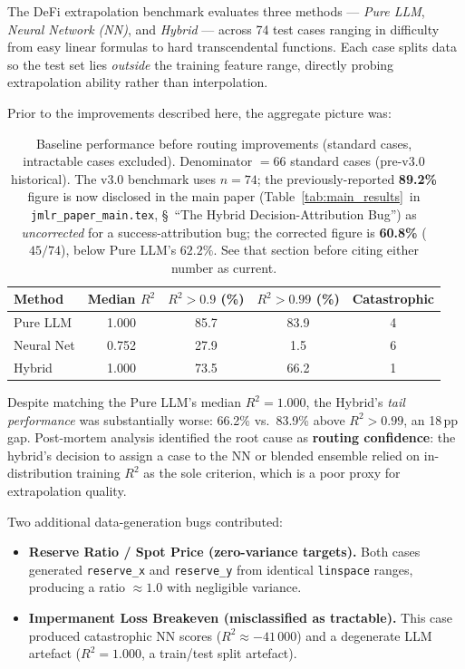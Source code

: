 \documentclass[twoside,11pt]{article}
\begin{document}
The DeFi extrapolation benchmark evaluates three methods --- \emph{Pure LLM},
\emph{Neural Network (NN)}, and \emph{Hybrid} --- across 74 test cases ranging
in difficulty from easy linear formulas to hard transcendental functions.
Each case splits data so the test set lies \emph{outside} the training feature
range, directly probing extrapolation ability rather than interpolation.

Prior to the improvements described here, the aggregate picture was:

\begin{table}[h]
\centering
\caption{Baseline performance before routing improvements (standard cases,
         intractable cases excluded). Denominator $= 66$ standard cases
         (pre-v3.0 historical). The v3.0 benchmark uses $n=74$; the
         previously-reported \textbf{89.2\%} figure is now disclosed in the
         main paper (Table~\ref{tab:main_results}\ in
         \texttt{jmlr\_paper\_main.tex}, \S~``The Hybrid
         Decision-Attribution Bug'') as \emph{uncorrected} for a
         success-attribution bug; the corrected figure is
         \textbf{60.8\%} ($45/74$), below Pure LLM's $62.2\%$. See that
         section before citing either number as current.}
\label{tab:baseline}
\begin{tabular}{lcccc}
\toprule
Method & Median $R^2$ & $R^2 > 0.9$ (\%) & $R^2 > 0.99$ (\%) & Catastrophic \\
\midrule
Pure LLM    & 1.000 & 85.7 & 83.9 & 4 \\
Neural Net  & 0.752 & 27.9 &  1.5 & 6 \\
Hybrid      & 1.000 & 73.5 & 66.2 & 1 \\
\bottomrule
\end{tabular}
\end{table}

Despite matching the Pure LLM's median $R^2 = 1.000$, the Hybrid's
\emph{tail performance} was substantially worse: 66.2\% vs.\ 83.9\% above
$R^2 > 0.99$, an 18\,pp gap.  Post-mortem analysis identified the root cause
as \textbf{routing confidence}: the hybrid's decision to assign a case to the
NN or blended ensemble relied on in-distribution training $R^2$ as the sole
criterion, which is a poor proxy for extrapolation quality.

Two additional data-generation bugs contributed:

\begin{itemize}[leftmargin=*]
  \item \textbf{Reserve Ratio / Spot Price (zero-variance targets).}
    Both cases generated \texttt{reserve\_x} and \texttt{reserve\_y} from
    identical \texttt{linspace} ranges, producing a ratio $\approx 1.0$ with
    negligible variance.
  \item \textbf{Impermanent Loss Breakeven (misclassified as tractable).}
    This case produced catastrophic NN scores ($R^2 \approx -41\,000$) and a
    degenerate LLM artefact ($R^2 = 1.000$, a train/test split artefact).
\end{itemize}
\end{document}
